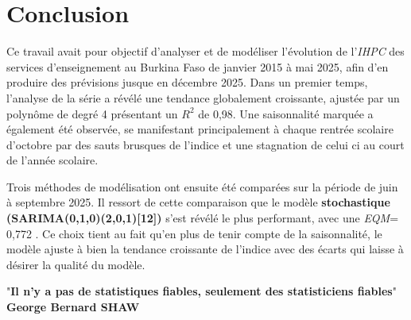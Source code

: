 \documentclass[
12pt,          %
a4paper,       %
oneside,       %
openright      %
]{report}
\newcommand{\IHPC}{\textit{IHPC}}
\newcommand{\EQM}{\textit{EQM}}
\begin{document}
\chapter*{Conclusion}


Ce travail avait pour objectif d’analyser et de modéliser l’évolution de l’\IHPC{} des services d’enseignement au Burkina Faso de janvier 2015 à mai 2025, afin d’en produire des prévisions jusque en décembre 2025.
Dans un premier temps, l’analyse de la série a révélé une tendance globalement croissante, ajustée par un polynôme de degré 4 présentant un $R^2$ de 0,98. Une saisonnalité marquée a également été observée, se manifestant principalement à chaque rentrée scolaire d’octobre par des sauts brusques de l’indice et une stagnation de celui ci au court de l'année scolaire.

Trois méthodes de modélisation ont ensuite été comparées sur la période de juin à septembre 2025. Il ressort de cette comparaison que le  modèle \textbf{stochastique (SARIMA(0,1,0)(2,0,1)[12])} s’est révélé le plus performant, avec une \EQM = 0,772 . Ce choix tient au fait qu'en plus de tenir compte de la saisonnalité, le modèle ajuste à bien la tendance croissante de l'indice avec des écarts qui laisse à désirer la qualité du modèle.



"\textbf{Il n'y a pas de statistiques fiables, seulement des statisticiens fiables}" \textbf{George Bernard SHAW}



\newpage



\cleardoublepage
{}
\nocite{*}





\cleardoublepage
{}
\appendix
\end{document}
